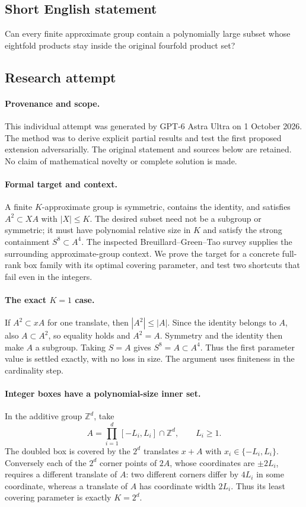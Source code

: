 \documentclass[11pt,a4paper]{article}
\newcommand{\Z}{\mathbb{Z}}
\begin{document}
\subsection{Short English statement}

Can every finite approximate group contain a polynomially large subset whose eightfold products stay inside the original fourfold product set?

\subsection{Research attempt}

\paragraph{Provenance and scope.}
This individual attempt was generated by GPT-6 Astra Ultra on 1 October 2026. The method was to derive explicit partial results and test the first proposed extension adversarially. The original statement and sources below are retained. No claim of mathematical novelty or complete solution is made.

\paragraph{Formal target and context.}
A finite $K$-approximate group is symmetric, contains the identity, and satisfies $A^2\subset XA$ with $|X|\leq K$. The desired subset need not be a subgroup or symmetric; it must have polynomial relative size in $K$ and satisfy the strong containment $S^8\subset A^4$. The inspected Breuillard--Green--Tao survey supplies the surrounding approximate-group context. We prove the target for a concrete full-rank box family with its optimal covering parameter, and test two shortcuts that fail even in the integers.

\paragraph{The exact $K=1$ case.}
If $A^2\subset xA$ for one translate, then $|A^2|\leq|A|$. Since the identity belongs to $A$, also $A\subset A^2$, so equality holds and $A^2=A$. Symmetry and the identity then make $A$ a subgroup. Taking $S=A$ gives $S^8=A\subset A^4$. Thus the first parameter value is settled exactly, with no loss in size. The argument uses finiteness in the cardinality step.

\paragraph{Integer boxes have a polynomial-size inner set.}
In the additive group $\Z^d$, take
\[
 A=\prod_{i=1}^d[-L_i,L_i]\cap\Z^d,\qquad L_i\geq1.
\]
The doubled box is covered by the $2^d$ translates $x+A$ with $x_i\in\{-L_i,L_i\}$. Conversely each of the $2^d$ corner points of $2A$, whose coordinates are $\pm2L_i$, requires a different translate of $A$: two different corners differ by $4L_i$ in some coordinate, whereas a translate of $A$ has coordinate width $2L_i$. Thus its least covering parameter is exactly $K=2^d$.
\end{document}
